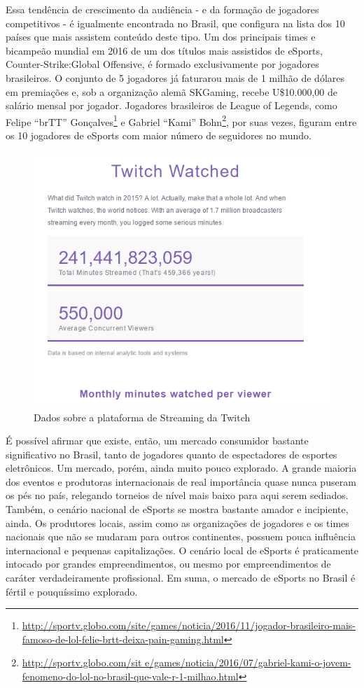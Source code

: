 \documentclass[a4paper, 12pt]{paper}
\begin{document}
Essa tendência de crescimento da audiência - e da formação de jogadores competitivos - é igualmente encontrada no Brasil, que configura na lista dos 10 países que mais assistem conteúdo deste tipo. Um dos principais times e bicampeão mundial em 2016 de um dos títulos mais assistidos de eSports, Counter-Strike:Global Offensive, é formado exclusivamente por jogadores brasileiros. O conjunto de 5 jogadores já faturarou mais de 1 milhão de dólares em premiações e, sob a organização alemã SKGaming, recebe U\$10.000,00 de salário mensal por jogador. Jogadores brasileiros de League of Legends, como Felipe “brTT” Gonçalves\footnote{\url{http://sportv.globo.com/site/games/noticia/2016/11/jogador-brasileiro-mais-famoso-de-lol-felie-brtt-deixa-pain-gaming.html}} e Gabriel “Kami” Bohn\footnote{\url{http://sportv.globo.com/sit e/games/noticia/2016/07/gabriel-kami-o-jovem-fenomeno-do-lol-no-brasil-que-vale-r-1-milhao.html}}, por suas vezes, figuram entre os 10 jogadores de eSports com maior número de seguidores no mundo.

\begin{figure}[!ht]
	\centering
	\includegraphics[scale=1]{img/img02.png}
	\caption{Dados sobre a plataforma de Streaming da Twitch}
\end{figure}
É possível afirmar que existe, então, um mercado consumidor bastante significativo no Brasil, tanto de jogadores quanto de espectadores de esportes eletrônicos. Um mercado, porém, ainda muito pouco explorado. A grande maioria dos eventos e produtoras internacionais de real importância quase nunca puseram os pés no país, relegando torneios de nível mais baixo para aqui serem sediados. Também, o cenário nacional de eSports se mostra bastante amador e incipiente, ainda. Os produtores locais, assim como as organizações de jogadores e os times nacionais que não se mudaram para outros continentes, possuem pouca influência internacional e pequenas capitalizações. O cenário local de eSports é praticamente intocado por grandes empreendimentos, ou mesmo por empreendimentos de caráter verdadeiramente profissional. Em suma, o mercado de eSports no Brasil é fértil e pouquíssimo explorado.
\end{document}

